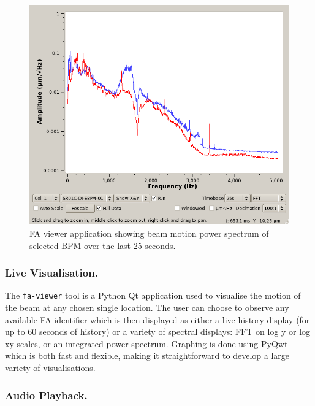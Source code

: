 \documentclass{JAC2003}
\begin{document}
\begin{figure}[ht]
\centering
\includegraphics[width=\linewidth]{THCHMUST03f6}
\caption{FA viewer application showing beam motion power spectrum of selected
BPM over the last 25 seconds.}
\label{fa-zoomer}
\end{figure}

\subsubsection{Live Visualisation.}

The \texttt{fa-viewer} tool is a Python Qt application used to visualise the
motion of the beam at any chosen single location.  The user can choose to
observe any available FA identifier which is then displayed as either a live
history display (for up to 60 seconds of history) or a variety of spectral
displays: FFT on log y or log xy scales, or an integrated power spectrum.
Graphing is done using PyQwt~\cite{pyqwt} which is both fast and flexible,
making it straightforward to develop a large variety of visualisations.

\subsubsection{Audio Playback.}
\end{document}
